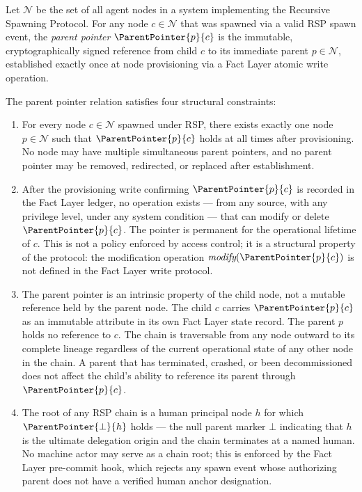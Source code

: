 \begin{definition}[ParentPointer]
\label{def:parent-pointer}
Let $\mathcal{N}$ be the set of all agent nodes in a \bxthree{} system implementing the Recursive Spawning Protocol. For any node $c \in \mathcal{N}$ that was spawned via a valid RSP spawn event, the \emph{parent pointer} $\ParentPointer{p}{c}$ is the immutable, cryptographically signed reference from child $c$ to its immediate parent $p \in \mathcal{N}$, established exactly once at node provisioning via a Fact Layer atomic write operation.

The parent pointer relation satisfies four structural constraints:

\begin{enumerate}
    \item[(P1) \textbf{Uniqueness}] For every node $c \in \mathcal{N}$ spawned under RSP, there exists exactly one node $p \in \mathcal{N}$ such that $\ParentPointer{p}{c}$ holds at all times after provisioning. No node may have multiple simultaneous parent pointers, and no parent pointer may be removed, redirected, or replaced after establishment.

    \item[(P2) \textbf{Immutability}] After the provisioning write confirming $\ParentPointer{p}{c}$ is recorded in the Fact Layer ledger, no operation exists --- from any source, with any privilege level, under any system condition --- that can modify or delete $\ParentPointer{p}{c}$. The pointer is permanent for the operational lifetime of $c$. This is not a policy enforced by access control; it is a structural property of the protocol: the modification operation $\textit{modify}(\ParentPointer{p}{c})$ is not defined in the Fact Layer write protocol.

    \item[(P3) \textbf{Directionality}] The parent pointer is an intrinsic property of the child node, not a mutable reference held by the parent node. The child $c$ carries $\ParentPointer{p}{c}$ as an immutable attribute in its own Fact Layer state record. The parent $p$ holds no reference to $c$. The chain is traversable from any node outward to its complete lineage regardless of the current operational state of any other node in the chain. A parent that has terminated, crashed, or been decommissioned does not affect the child's ability to reference its parent through $\ParentPointer{p}{c}$.

    \item[(P4) \textbf{Human Anchor Termination}] The root of any RSP chain is a human principal node $h$ for which $\ParentPointer{\bot}{h}$ holds --- the null parent marker $\bot$ indicating that $h$ is the ultimate delegation origin and the chain terminates at a named human. No machine actor may serve as a chain root; this is enforced by the Fact Layer pre-commit hook, which rejects any spawn event whose authorizing parent does not have a verified human anchor designation.
\end{enumerate}
\end{definition}

